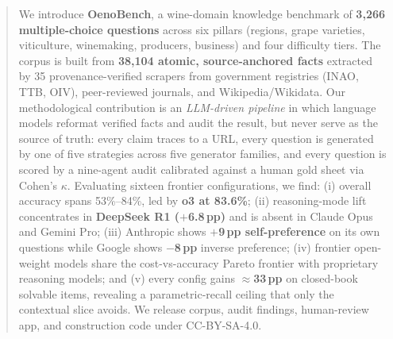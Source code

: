 \begin{abstract}
We introduce \textbf{OenoBench}, a wine-domain knowledge benchmark of
\textbf{3{,}266 multiple-choice questions} across six pillars (regions,
grape varieties, viticulture, winemaking, producers, business) and four
difficulty tiers. The corpus is built from \textbf{38{,}104 atomic,
source-anchored facts} extracted by 35 provenance-verified scrapers
from government registries (INAO, TTB, OIV), peer-reviewed journals,
and Wikipedia/Wikidata. Our methodological contribution is an
\emph{LLM-driven pipeline} in which language models reformat verified
facts and audit the result, but never serve as the source of truth:
every claim traces to a URL, every question is generated by one of
five strategies across five generator families, and every question
is scored by a nine-agent audit calibrated against a human gold sheet
via Cohen's $\kappa$. Evaluating sixteen frontier configurations, we
find: (i) overall accuracy spans 53\%--84\%, led by \textbf{o3 at
83.6\%}; (ii) reasoning-mode lift concentrates in \textbf{DeepSeek R1
($+$6.8\,pp)} and is absent in Claude Opus and Gemini Pro;
(iii) Anthropic shows \textbf{$+$9\,pp self-preference} on its own
questions while Google shows \textbf{$-$8\,pp} inverse preference;
(iv) frontier open-weight models share the cost-vs-accuracy Pareto
frontier with proprietary reasoning models; and (v) every config
gains \textbf{$\approx$33\,pp} on closed-book solvable items, revealing
a parametric-recall ceiling that only the contextual slice avoids. We
release corpus, audit findings, human-review app, and construction
code under CC-BY-SA-4.0.
\end{abstract}
